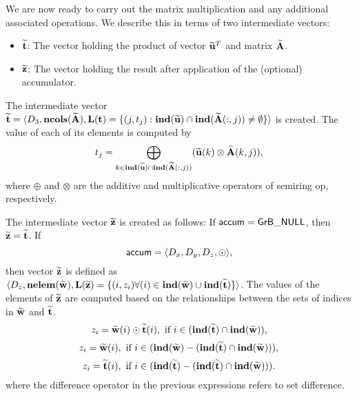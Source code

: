 We are now ready to carry out the matrix multiplication and any additional 
associated operations.  We describe this in terms of two intermediate vectors:
\begin{itemize}
	\item ${\bf \widetilde{t}}$: The vector holding the product of vector
    ${\bf \widetilde{u}}^T$ and matrix ${\bf \widetilde{A}}$.
	\item ${\bf \widetilde{z}}$: The vector holding the result after 
    application of the (optional) accumulator.
\end{itemize}

The intermediate vector ${\bf \widetilde{t}} = \langle
D_3, \bold{ncols}({\bf \widetilde{A}}),
\bold{L}({\bf t}) =
\{(j,t_j) : \bold{ind}({\bf \widetilde{u}}) \cap
\bold{ind}({\bf \widetilde{A}}(:,j)) \neq \emptyset \} \rangle$
is created.  The value of each of its elements is computed by \[t_j
= \bigoplus_{k \in \bold{ind}({\bf \widetilde{u}}) \cap
\bold{ind}({\bf \widetilde{A}}(:,j))} ({\bf \widetilde{u}}(k)
\otimes {\bf \widetilde{A}}(k,j)),\] where $\oplus$ and $\otimes$
are the additive and multiplicative operators of semiring {\sf op},
respectively.

The intermediate vector ${\bf \widetilde{z}}$ is created as follows:
If ${\sf accum} = {\sf GrB\_NULL}$, then ${\bf \widetilde{z}} = {\bf \widetilde{t}}$.
If \[ {\sf accum} = \langle D_x, D_y, D_z, \odot \rangle, \] then vector ${\bf \widetilde{z}}$ is defined as $\langle D_z, \bold{nelem}({\bf \widetilde{w}}), \bold{L}({\bf \widetilde{z}}) 
		= \{(i,z_{i})  \forall (i) \in \bold{ind}({\bf \widetilde{w}}) \cup \bold{ind}({\bf \widetilde{t}}) \} \rangle$.  
The values of the elements of ${\bf \widetilde{z}}$ are computed based on the relationships between the sets of indices in ${\bf \widetilde{w}}$ and ${\bf \widetilde{t}}$.
\[
z_{i} = {\bf \widetilde{w}}(i) \odot {\bf \widetilde{t}}(i), \ \mbox{if}\  i \in  (\bold{ind}({\bf \widetilde{t}}) \cap \bold{ind}({\bf \widetilde{w}})),
\]
\[
z_{i} = \vector{\widetilde{w}}(i), \ \mbox{if}\  i \in  (\bold{ind}(\vector{\widetilde{w}}) - (\bold{ind}(\vector{\widetilde{t}}) \cap \bold{ind}(\vector{\widetilde{w}}))),
\]
\[
z_{i} = \vector{\widetilde{t}}(i), \ \mbox{if}\  i \in  (\bold{ind}(\vector{\widetilde{t}}) - (\bold{ind}(\vector{\widetilde{t}}) \cap \bold{ind}(\vector{\widetilde{w}}))).
\]
where the difference operator in the previous expressions refers to set difference.

